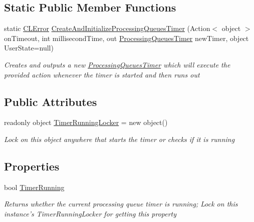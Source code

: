 \subsection*{Static Public Member Functions}
\begin{DoxyCompactItemize}
\item 
static \hyperlink{class_cloud_api_public_1_1_model_1_1_c_l_error}{C\-L\-Error} \hyperlink{class_cloud_api_public_1_1_support_1_1_processing_queues_timer_a7867153d23e8389b44c0dfcc5d21d79c}{Create\-And\-Initialize\-Processing\-Queues\-Timer} (Action$<$ object $>$ on\-Timeout, int millisecond\-Time, out \hyperlink{class_cloud_api_public_1_1_support_1_1_processing_queues_timer}{Processing\-Queues\-Timer} new\-Timer, object User\-State=null)
\begin{DoxyCompactList}\small\item\em Creates and outputs a new \hyperlink{class_cloud_api_public_1_1_support_1_1_processing_queues_timer}{Processing\-Queues\-Timer} which will execute the provided action whenever the timer is started and then runs out \end{DoxyCompactList}\end{DoxyCompactItemize}
\subsection*{Public Attributes}
\begin{DoxyCompactItemize}
\item 
readonly object \hyperlink{class_cloud_api_public_1_1_support_1_1_processing_queues_timer_a74215d223073c2371723859f4b9db193}{Timer\-Running\-Locker} = new object()
\begin{DoxyCompactList}\small\item\em Lock on this object anywhere that starts the timer or checks if it is running \end{DoxyCompactList}\end{DoxyCompactItemize}
\subsection*{Properties}
\begin{DoxyCompactItemize}
\item 
bool \hyperlink{class_cloud_api_public_1_1_support_1_1_processing_queues_timer_ac9b82de50ef2dafdfd052c7b7d641611}{Timer\-Running}
\begin{DoxyCompactList}\small\item\em Returns whether the current processing queue timer is running; Lock on this instance's Timer\-Running\-Locker for getting this property \end{DoxyCompactList}\end{DoxyCompactItemize}


